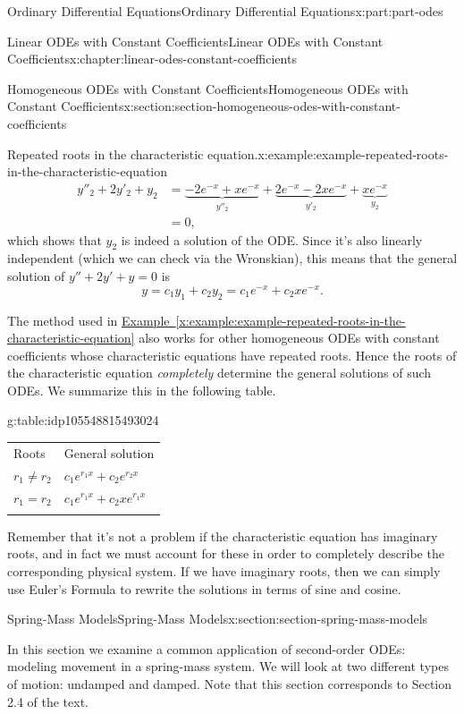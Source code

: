 \documentclass[twoside,10pt,]{book}
\newcommand{\tabularfont}{\relax}
\newcommand{\xreffont}{\relax}
\numberwithin{equation}{part}
\newcommand{\hrulethick} {\noalign{\hrule height 0.11em}}
\newcommand{\amp}{&}
\begin{document}
\begin{partptx}{Ordinary Differential Equations}{}{Ordinary Differential Equations}{}{}{x:part:part-odes}
\begin{chapterptx}{Linear ODEs with Constant Coefficients}{}{Linear ODEs with Constant Coefficients}{}{}{x:chapter:linear-odes-constant-coefficients}
\begin{sectionptx}{Homogeneous ODEs with Constant Coefficients}{}{Homogeneous ODEs with Constant Coefficients}{}{}{x:section:section-homogeneous-odes-with-constant-coefficients}
\begin{example}{Repeated roots in the characteristic equation.}{x:example:example-repeated-roots-in-the-characteristic-equation}
\begin{align*}
y''_{2} + 2y'_{2} + y_{2} \amp = \underbrace{-2e^{-x} + xe^{-x}}_{y''_{2}} + \underbrace{2e^{-x} - 2xe^{-x}}_{y'_{2}} + \underbrace{xe^{-x}}_{y_{2}} \\
\amp = 0, 
\end{align*}
which shows that \(y_{2}\) is indeed a solution of the ODE. Since it's also linearly independent (which we can check via the Wronskian), this means that the general solution of \(y''+2y'+y=0\) is%
\begin{equation*}
y = c_{1}y_{1} + c_{2}y_{2} = c_{1}e^{-x} + c_{2}xe^{-x}. 
\end{equation*}
%
\end{example}
The method used in \hyperref[x:example:example-repeated-roots-in-the-characteristic-equation]{Example~{\xreffont\ref{x:example:example-repeated-roots-in-the-characteristic-equation}}} also works for other homogeneous ODEs with constant coefficients whose characteristic equations have repeated roots. Hence the roots of the characteristic equation \emph{completely} determine the general solutions of such ODEs. We summarize this in the following table.%
\begin{tableptx}{\textbf{}}{g:table:idp105548815493024}{}%
\centering%
{\tabularfont%
\begin{tabular}{ll}\hrulethick
Roots&General solution\tabularnewline\hrulethick
\(r_{1}\neq r_{2}\)&\(c_{1}e^{r_{1}x} + c_{2}e^{r_{2}x}\)\tabularnewline\hrulethick
\(r_{1} = r_{2}\)&\(c_{1}e^{r_{1}x} + c_{2}xe^{r_{1}x}\)\tabularnewline\hrulethick
\end{tabular}
}%
\end{tableptx}%
Remember that it's not a problem if the characteristic equation has imaginary roots, and in fact we must account for these in order to completely describe the corresponding physical system. If we have imaginary roots, then we can simply use Euler's Formula to rewrite the solutions in terms of sine and cosine.%
\end{sectionptx}
%
%
\typeout{************************************************}
\typeout{************************************************}
%
\begin{sectionptx}{Spring-Mass Models}{}{Spring-Mass Models}{}{}{x:section:section-spring-mass-models}
\begin{introduction}{}%
In this section we examine a common application of second-order ODEs: modeling movement in a spring-mass system. We will look at two different types of motion: undamped and damped. Note that this section corresponds to Section 2.4 of the text.%

\end{introduction}
\end{sectionptx}
\end{chapterptx}
\end{partptx}
\end{document}
